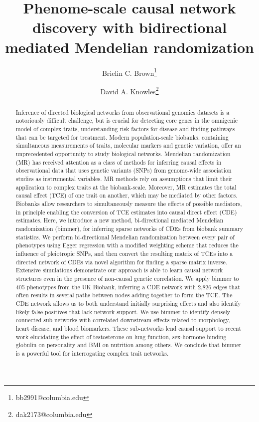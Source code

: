 \documentclass{article}
\title{Phenome-scale causal network discovery with
bidirectional mediated Mendelian randomization}
\author[1, 2]{Brielin C. Brown\thanks{bb2991@columbia.edu}}
\author[2, 3, 4]{David A. Knowles\thanks{dak2173@columbia.edu}}
\affil[1]{Data Science Institute, Columbia University, New York, NY}
\affil[2]{New York Genome Center, New York, NY}
\affil[3]{Department of Computer Science, Columbia University, New York, NY}
\affil[4]{Department of Systems Biology, Columbia University, New York, NY}
\date{}
\begin{document}
\maketitle

\begin{abstract}
Inference of directed biological networks from observational genomics datasets is a
notoriously difficult challenge, but is crucial for detecting core genes in the omnigenic
model of complex traits, understanding risk factors for disease and finding pathways that
can be targeted for treatment. Modern population-scale biobanks, containing simultaneous
measurements of traits, molecular markers and genetic variation, offer an unprecedented
opportunity to study biological networks. Mendelian randomization (MR) has received attention
as a class of methods for inferring causal effects in observational data that uses genetic variants
(SNPs) from genome-wide association studies as instrumental variables. MR methods rely on assumptions
that limit their application to complex traits at the biobank-scale. Moreover, MR estimates
the total causal effect (TCE) of one trait on another, which may be mediated by other factors.
Biobanks allow researchers to simultaneously measure the effects of possible mediators, in
principle enabling the conversion of TCE estimates into causal direct effect (CDE) estimates.
Here, we introduce a new method, bi-directional mediated Mendelian randomization (bimmer),
for inferring sparse networks of CDEs from biobank summary statistics. We perform bi-directional
Mendelian randomization between every pair of phenotypes using Egger regression with a modified
weighting scheme that reduces the influence of pleiotropic SNPs, and then convert the resulting
matrix of TCEs into a directed network of CDEs via novel algorithm for finding a sparse matrix inverse.
Extensive simulations demonstrate our approach is able to learn causal network structures even in
the presence of non-causal genetic correlation. We apply bimmer to 405 phenotypes from the UK Biobank,
inferring a CDE network with 2,826 edges that often results in several paths between nodes adding
together to form the TCE. The CDE network allows us to both understand initially surprising effects
and also identify likely false-positives that lack network support. We use bimmer to identify densely
connected sub-networks with correlated downstream effects related to morphology, heart disease,
and blood biomarkers. These sub-networks lend causal support to recent work elucidating the effect of
testosterone on lung function, sex-hormone binding globulin on personality and BMI on nutrition among
others. We conclude that bimmer is a powerful tool for interrogating complex trait networks.
\end{abstract}
\end{document}
